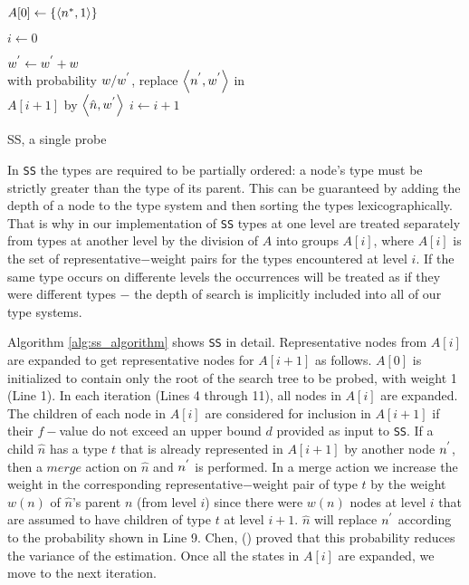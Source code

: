 \begin{algorithm}

$A[0] \leftarrow \{\left\langle  n\sp{*},1 \right\rangle \}$

$i \leftarrow 0$

 {
	 {
		 {
			 {
				 {
				$w\sp{'} \leftarrow w\sp{'} + w$\\ 
				with probability $w/w\sp{'}$, replace $\left\langle n\sp{'}, w\sp{'} \right\rangle$ in\\ $A[i+1]$ by $\left\langle \hat{n},w\sp{'} \right\rangle$
				} 
			}
		}
	}
	$i \leftarrow i + 1$
}
\caption{SS, a single probe}
\label{alg:ss_algorithm}
\end{algorithm}

In \texttt{SS} the types are required to be partially ordered: a node's type must be strictly greater than the type of its parent. This can be guaranteed by adding the depth of a node to the type system and then sorting the types lexicographically. That is why in our implementation of \texttt{SS} types at one level are treated separately from types at another level by the division of $A$ into groups $A[i]$, where $A[i]$ is the set of representative$-$weight pairs for the types encountered at level $i$. If the same type occurs on differente levels the occurrences will be treated as if they were different types $-$ the depth of search is implicitly included into all of our type systems.

Algorithm \ref{alg:ss_algorithm} shows \texttt{SS} in detail. Representative nodes from $A[i]$ are expanded to get representative nodes for $A[i+1]$ as follows. $A[0]$ is initialized to contain only the root of the search tree to be probed, with weight 1 (Line 1). In each iteration (Lines 4 through 11), all nodes in $A[i]$ are expanded. The children of each node in $A[i]$ are considered for inclusion in $A[i+1]$ if their $f-$value do not exceed an upper bound $d$ provided as input to \texttt{SS}. If a child $\hat{n}$ has a type $t$ that is already represented in $A[i+1]$ by another node $n\sp{'}$, then a $merge$ action on $\hat{n}$ and $n\sp{'}$ is performed. In a merge action we increase the weight in the corresponding representative$-$weight pair of type $t$ by the weight $w(n)$ of $\hat{n}$'s parent $n$ (from level $i$) since there were $w(n)$ nodes at level $i$ that are assumed to have children of type $t$ at level $i+1$. $\hat{n}$ will replace $n\sp{'}$ according to the probability shown in Line 9. Chen, (\citeyear{chen1992heuristic}) proved that this probability reduces the variance of the estimation. Once all the states in $A[i]$ are expanded, we move to the next iteration.

